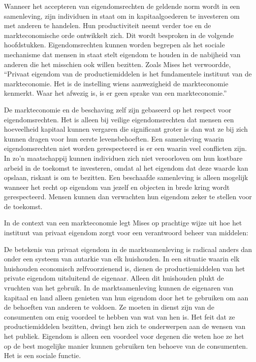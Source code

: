 Wanneer het accepteren van eigendomsrechten de geldende norm wordt in een samenleving, zijn individuen in staat om in kapitaalgoederen te investeren om met anderen te handelen. Hun productiviteit neemt verder toe en de markteconomische orde ontwikkelt zich. Dit wordt besproken in de volgende hoofdstukken. Eigendomsrechten kunnen worden begrepen als het sociale mechanisme dat mensen in staat stelt eigendom te houden in de nabijheid van anderen die het misschien ook willen bezitten. Zoals Mises het verwoordde, \enquote{Privaat eigendom van de productiemiddelen is het fundamentele instituut van de markteconomie. Het is de instelling wiens aanwezigheid de markteconomie kenmerkt. Waar het afwezig is, is er geen sprake van een markteconomie.}\autocite{55}

De markteconomie en de beschaving zelf zijn gebaseerd op het respect voor eigendomsrechten. Het is alleen bij veilige eigendomsrechten dat mensen een hoeveelheid kapitaal kunnen vergaren die significant groter is dan wat ze bij zich kunnen dragen voor hun eerste levensbehoeften. Een samenleving waarin eigendomsrechten niet worden gerespecteerd is er een waarin veel conflicten zijn. In zo'n maatschappij kunnen individuen zich niet veroorloven om hun kostbare arbeid in de toekomst te investeren, omdat al het eigendom dat deze waarde kan opslaan, riskant is om te bezitten. Een beschaafde samenleving is alleen mogelijk wanneer het recht op eigendom van jezelf en objecten in brede kring wordt gerespecteerd. Mensen kunnen dan verwachten hun eigendom zeker te stellen voor de toekomst.

In de context van een markteconomie legt Mises op prachtige wijze uit hoe het instituut van privaat eigendom zorgt voor een verantwoord beheer van middelen:

\begin{blockquotebox}
    De betekenis van privaat eigendom in de marktsamenleving is radicaal anders dan onder een systeem van autarkie van elk huishouden. In een situatie waarin elk huishouden economisch zelfvoorzienend is, dienen de productiemiddelen van het private eigendom uitsluitend de eigenaar. Alleen dit huishouden plukt de vruchten van het gebruik. In de marktsamenleving kunnen de eigenaren van kapitaal en land alleen genieten van hun eigendom door het te gebruiken om aan de behoeften van anderen te voldoen. Ze moeten in dienst zijn van de consumenten om enig voordeel te hebben van wat van hen is. Het feit dat ze productiemiddelen bezitten, dwingt hen zich te onderwerpen aan de wensen van het publiek. Eigendom is alleen een voordeel voor degenen die weten hoe ze het op de best mogelijke manier kunnen gebruiken ten behoeve van de consumenten. Het is een sociale functie.\footnotemark
\end{blockquotebox}

